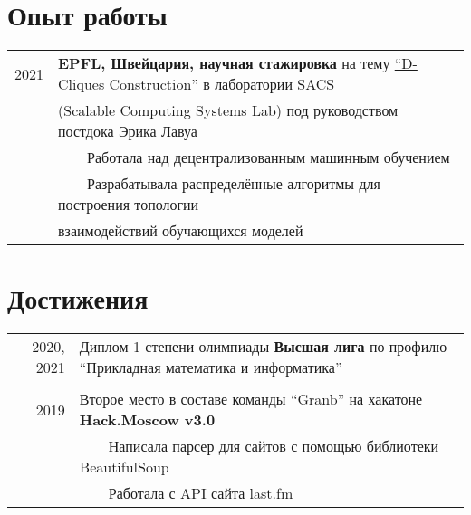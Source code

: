 \documentclass[a4paper,10pt]{article}
\newcommand{\tabitem}{~~\llap{\textbullet}~~}
\begin{document}
\section{Опыт работы}
\begin{tabular}{rl}
\hspace{0.9cm} 2021 & \textbf{EPFL, Швейцария, научная стажировка} на тему \href{https://www.epfl.ch/labs/sacs/completed-student-projects/}{``D-Cliques Construction''} в лаборатории SACS \\
& (Scalable Computing Systems Lab) под руководством постдока Эрика Лавуа\\
& \tabitem Работала над децентрализованным машинным обучением \\
& \tabitem Разрабатывала распределённые алгоритмы для построения топологии \\
& взаимодействий обучающихся моделей \\
\end{tabular}

\section{Достижения}
\begin{tabular}{rl}
2020, 2021 & Диплом 1 степени олимпиады \textbf{Высшая лига} по профилю ``Прикладная математика и информатика'' \\
&\\
\hspace{0.9cm} 2019 & Второе место в составе команды ``Granb'' на хакатоне \textbf{Hack.Moscow v3.0} \\
& \tabitem Написала парсер для сайтов с помощью библиотеки BeautifulSoup \\
& \tabitem Работала с API сайта last.fm \\
\end{tabular}
\end{document}
